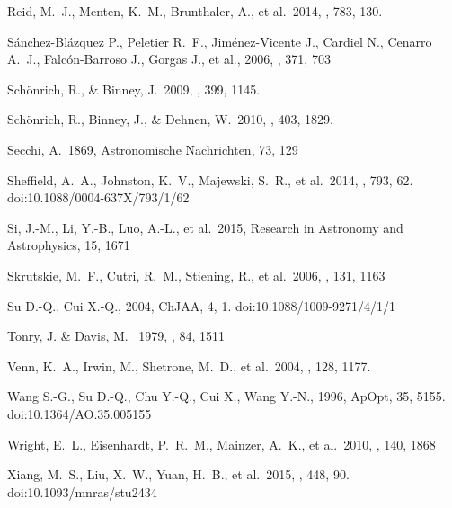 \documentclass[manuscript]{aastex62}
\begin{document}
\begin{CJK*}{UTF8}{gbsn}
\begin{thebibliography}{}
 Reid, M.~J., Menten, K.~M., Brunthaler, A., et al.\ 2014, \apj, 783, 130.

 S{\'a}nchez-Bl{\'a}zquez P., Peletier R.~F., Jim{\'e}nez-Vicente J., Cardiel N., Cenarro A.~J., Falc{\'o}n-Barroso J., Gorgas J., et al., 2006, \mnras, 371, 703


 Sch{\"o}nrich, R., \& Binney, J.\ 2009, \mnras, 399, 1145.

 Sch{\"o}nrich, R., Binney, J., \& Dehnen, W.\ 2010, \mnras, 403, 1829.

 Secchi, A.\ 1869, Astronomische Nachrichten, 73, 129


 Sheffield, A.~A., Johnston, K.~V., Majewski, S.~R., et al.\ 2014, \apj, 793, 62. doi:10.1088/0004-637X/793/1/62

 Si, J.-M., Li, Y.-B., Luo, A.-L., et al.\ 2015, Research in Astronomy and Astrophysics, 15, 1671 

 Skrutskie, M.~F., Cutri, R.~M., Stiening, R., et al.\ 2006, \aj, 131, 1163 

 Su D.-Q., Cui X.-Q., 2004, ChJAA, 4, 1. doi:10.1088/1009-9271/4/1/1

 Tonry, J. \& Davis, M. \ 1979, \aj, 84, 1511

 Venn, K.~A., Irwin, M., Shetrone, M.~D., et al.\ 2004, \aj, 128, 1177.

 Wang S.-G., Su D.-Q., Chu Y.-Q., Cui X., Wang Y.-N., 1996, ApOpt, 35, 5155. doi:10.1364/AO.35.005155


 Wright, E.~L., Eisenhardt, P.~R.~M., Mainzer, A.~K., et al.\ 2010, \aj, 140, 1868 

 Xiang, M.~S., Liu, X.~W., Yuan, H.~B., et al.\ 2015, \mnras, 448, 90. doi:10.1093/mnras/stu2434


\end{thebibliography}
\end{CJK*}
\end{document}
